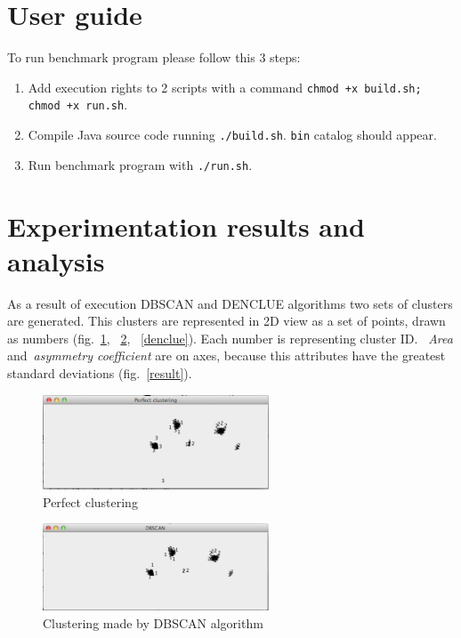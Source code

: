\documentclass[12pt, a4paper, notitlepage, oneside]{article}
\begin{document}
\section{User guide}

To run benchmark program please follow this 3 steps:

\begin{enumerate}
\item Add execution rights to 2 scripts with a command \texttt{chmod +x build.sh; chmod +x run.sh}.
\item Compile Java source code running \texttt{./build.sh}. \texttt{bin} catalog should appear.
\item Run benchmark program with \texttt{./run.sh}.
\end{enumerate}

\cleardoublepage

\section{Experimentation results and analysis}

As a result of execution DBSCAN and DENCLUE algorithms two sets of clusters are generated. 
This clusters are represented in 2D view as a set of points, drawn as numbers (fig.~\ref{perfect}, ~\ref{dbscan}, ~\ref{denclue}). 
Each number is representing cluster ID. ~\textit{Area} and~\textit{asymmetry coefficient} are on axes,
because this attributes have the greatest standard deviations (fig.~\ref{result}).

\begin{figure}[!ht]
 	\centering
	\includegraphics[width=0.6\textwidth]{images/perfect.png}
 	\caption[]
	{Perfect clustering}
	\label{perfect}
	\end{figure}

\begin{figure}[!ht]
 	\centering
	\includegraphics[width=0.6\textwidth]{images/dbscan.png}
 	\caption[]
	{Clustering made by DBSCAN algorithm}
	\label{dbscan}
	\end{figure}
\end{document}
